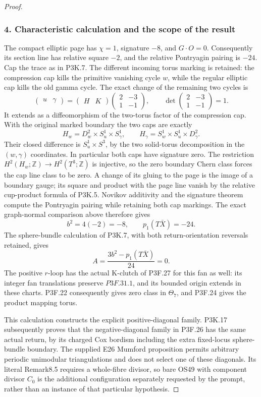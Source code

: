 \begin{proof}
\subsubsection{4. Characteristic calculation and the scope of the result}\label{characteristic-calculation-and-the-scope-of-the-result}

The compact elliptic page has \(\chi=1\), signature \(-8\), and \(G\cdot O=0\). Consequently its section line has relative square \(-2\), and the relative Pontryagin pairing is \(-24\). Cap the trace as in P3K.7. The different incoming torus marking is retained: the compression cap kills the primitive vanishing cycle \(w\), while the regular elliptic cap kills the old gamma cycle. The exact change of the remaining two cycles is \[
 \begin{pmatrix}u&\gamma\end{pmatrix}
 =\begin{pmatrix}H&K\end{pmatrix}
   \begin{pmatrix}2&-3\\1&-1\end{pmatrix},
 \qquad\det\begin{pmatrix}2&-3\\1&-1\end{pmatrix}=1.
\] It extends as a diffeomorphism of the two-torus factor of the compression cap. With the original marked boundary the two caps are exactly \[
 H_w=D^2_w\times S^1_u\times S^1_\gamma,\qquad
 H_\gamma=S^1_w\times S^1_u\times D^2_\gamma.
\] Their closed difference is \(S^1_u\times S^3\), by the two solid-torus decomposition in the \((w,\gamma)\) coordinates. In particular both caps have signature zero. The restriction \(H^2(H_w;\mathbb Z)\to H^2(T^3;\mathbb Z)\) is injective, so the zero boundary Chern class forces the cap line class to be zero. A change of its gluing to the page is the image of a boundary gauge; its square and product with the page line vanish by the relative cup-product formula of P3K.5. Novikov additivity and the signature theorem compute the Pontryagin pairing while retaining both cap markings. The exact graph-normal comparison above therefore gives \[
 b^2=4(-2)=-8,\qquad p_1(T\bar X)=-24.
\] The sphere-bundle calculation of P3K.7, with both return-orientation reversals retained, gives \[
 A=\frac{3b^2-p_1(T\bar X)}{24}=0.
\] The positive \(r\)-loop has the actual K-clutch of P3F.27 for this fan as well: its integer fan translations preserve \(P3F.31.1\), and its bounded origin extends in these charts. P3F.22 consequently gives zero class in \(\Theta_7\), and P3F.24 gives the product mapping torus.

This calculation constructs the explicit positive-diagonal family. P3K.17 subsequently proves that the negative-diagonal family in P3F.26 has the same actual return, by its charged Cox bordism including the extra fixed-locus sphere-bundle boundary. The supplied E26 Mumford proposition permits arbitrary periodic unimodular triangulations and does not select one of these diagonals. Its literal Remark8.5 requires a whole-fibre divisor, so bare OS49 with component divisor \(C_0\) is the additional configuration separately requested by the prompt, rather than an instance of that particular hypothesis.
\end{proof}
